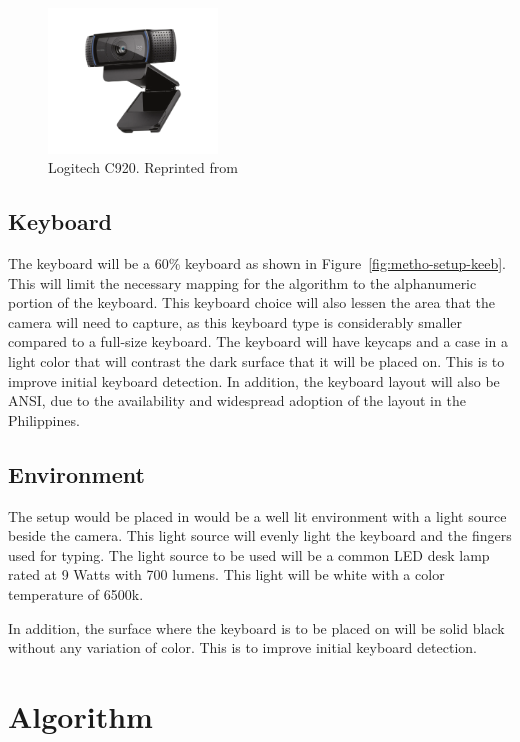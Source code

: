 \documentclass{report}
\begin{document}
\begin{figure}[H]
	\centering
	\includegraphics[width=0.4\textwidth]{webcam.png}
	\caption{Logitech C920. Reprinted from }
	\label{fig:metho-setup-cam}
	\centering
\end{figure}

\subsection{Keyboard}
\label{section:metho-keeb}

The keyboard will be a 60\% keyboard as shown in
Figure~\ref{fig:metho-setup-keeb}. This will limit the necessary mapping for the
algorithm to the alphanumeric portion of the keyboard. This keyboard choice will
also lessen the area that the camera will need to capture, as this keyboard type
is considerably smaller compared to a full-size keyboard. The keyboard will have
keycaps and a case in a light color that will contrast the dark surface that it
will be placed on. This is to improve initial keyboard detection. In addition,
the keyboard layout will also be ANSI, due to the availability and widespread
adoption of the layout in the Philippines.

\subsection{Environment}
The setup would be placed in would be a well lit environment with a light source
beside the camera. This light source will evenly light the keyboard and the
fingers used for typing. The light source to be used will be a common LED desk
lamp rated at 9 Watts with 700 lumens. This light will be white with a color
temperature of 6500k.

In addition, the surface where the keyboard is to be placed on will be solid
black without any variation of color. This is to improve initial keyboard
detection.

\section{Algorithm}
\label{section:metho-algo}
\end{document}

